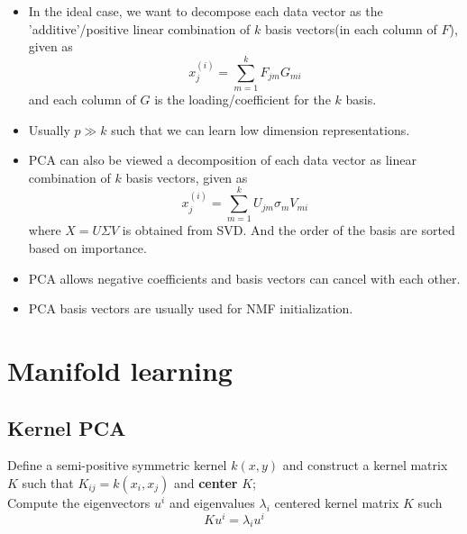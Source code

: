 \begin{refsection}
\begin{remark}[interpretation]\hfill
\begin{itemize}
    \item In the ideal case, we want to decompose each data vector as the 'additive'/positive linear combination of $k$ basis vectors(in each column of $F$), given as
        $$x^(i)_{j} = \sum_{m=1}^k F_{jm}G_{mi}$$
    and each column of $G$ is the loading/coefficient for the $k$ basis.
    \item Usually $p \gg k$ such that we can learn low dimension representations.
\end{itemize}
\end{remark}


\begin{remark}\hfill
\begin{itemize}
    \item PCA can also be viewed a decomposition of each data vector as linear combination of $k$ basis vectors, given as
    $$x^(i)_{j} = \sum_{m=1}^k U_{jm}\sigma_mV_{mi}$$
    where $X = U\Sigma V$ is obtained from SVD. And the order of the basis are sorted based on importance. 
    \item PCA allows negative coefficients and basis vectors can cancel with each other.
    \item PCA basis vectors are usually used for NMF initialization.
\end{itemize}
\end{remark}






\section{Manifold learning}
\subsection{Kernel PCA}


\begin{algorithm}[H]
\SetAlgoLined
{}
 Define a semi-positive symmetric kernel $k(x,y)$ and construct a kernel matrix $K$ such that $K_{ij} = k(x_i,x_j)$ and \textbf{center} $K$;\\
 
 Compute the eigenvectors $u^i$ and eigenvalues $\lambda_i$ centered kernel matrix $K$ such
 $$Ku^i = \lambda_i u^i$$
 

\end{algorithm}
\end{refsection}
